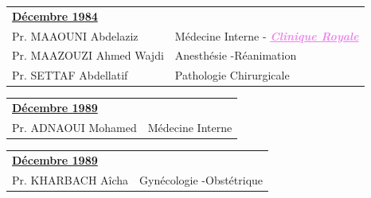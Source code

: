 \vspace*{1em}

\begin{tabular}{l l}
  \multicolumn{2}{l}{\textbf{\underline{Décembre 1984}}}\vspace*{.5em}\\
  Pr. MAAOUNI Abdelaziz & \hspace*{2em} Médecine Interne - \textcolor{violet}{\textbf{\emph{\underline{Clinique Royale}}}}\\
  Pr. MAAZOUZI Ahmed Wajdi & \hspace*{2em} Anesthésie -Réanimation \\
  Pr. SETTAF Abdellatif & \hspace*{2em} Pathologie Chirurgicale \\
  
 \end{tabular}
 
 \vspace*{1em}



 \begin{tabular}{l l}
  \multicolumn{2}{l}{\textbf{\underline{Décembre 1989}}}\vspace*{.5em}\\
  Pr. ADNAOUI Mohamed & \hspace*{5em} Médecine Interne\\
  
 \end{tabular}

 \vspace*{1em}

 \begin{tabular}{l l}
  \multicolumn{2}{l}{\textbf{\underline{Décembre 1989}}}\vspace*{.5em}\\
  Pr. KHARBACH Aîcha & \hspace*{6em} Gynécologie -Obstétrique\\  
 \end{tabular}

